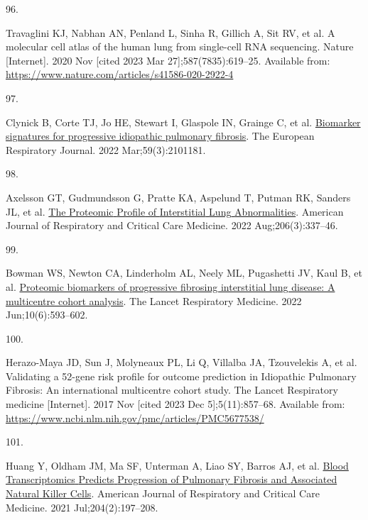 \documentclass[
]{article}
\newlength{\cslhangindent}
\newlength{\csllabelwidth}
\newenvironment{CSLReferences}[2] %
 {\begin{list}{}{%
  \setlength{\itemindent}{0pt}
  \setlength{\leftmargin}{0pt}
  \setlength{\parsep}{0pt}
  \ifodd #1
   \setlength{\leftmargin}{\cslhangindent}
   \setlength{\itemindent}{-1\cslhangindent}
  \fi
  \setlength{\itemsep}{#2\baselineskip}}}
 {\end{list}}
\newcommand{\CSLLeftMargin}[1]{\parbox[t]{\csllabelwidth}{\strut#1\strut}}
\newcommand{\CSLRightInline}[1]{\parbox[t]{\linewidth - \csllabelwidth}{\strut#1\strut}}
\begin{document}
\begin{CSLReferences}{0}{1}
\CSLLeftMargin{96. }%
\CSLRightInline{Travaglini KJ, Nabhan AN, Penland L, Sinha R, Gillich A, Sit RV, et al. A molecular cell atlas of the human lung from single-cell {RNA} sequencing. Nature {[}Internet{]}. 2020 Nov {[}cited 2023 Mar 27{]};587(7835):619--25. Available from: \url{https://www.nature.com/articles/s41586-020-2922-4}}

\CSLLeftMargin{97. }%
\CSLRightInline{Clynick B, Corte TJ, Jo HE, Stewart I, Glaspole IN, Grainge C, et al. \href{https://doi.org/10.1183/13993003.01181-2021}{Biomarker signatures for progressive idiopathic pulmonary fibrosis}. The European Respiratory Journal. 2022 Mar;59(3):2101181. }

\CSLLeftMargin{98. }%
\CSLRightInline{Axelsson GT, Gudmundsson G, Pratte KA, Aspelund T, Putman RK, Sanders JL, et al. \href{https://doi.org/10.1164/rccm.202110-2296OC}{The {Proteomic} {Profile} of {Interstitial} {Lung} {Abnormalities}}. American Journal of Respiratory and Critical Care Medicine. 2022 Aug;206(3):337--46. }

\CSLLeftMargin{99. }%
\CSLRightInline{Bowman WS, Newton CA, Linderholm AL, Neely ML, Pugashetti JV, Kaul B, et al. \href{https://doi.org/10.1016/S2213-2600(21)00503-8}{Proteomic biomarkers of progressive fibrosing interstitial lung disease: A multicentre cohort analysis}. The Lancet Respiratory Medicine. 2022 Jun;10(6):593--602. }

\CSLLeftMargin{100. }%
\CSLRightInline{Herazo-Maya JD, Sun J, Molyneaux PL, Li Q, Villalba JA, Tzouvelekis A, et al. Validating a 52-gene risk profile for outcome prediction in {Idiopathic} {Pulmonary} {Fibrosis}: An international multicentre cohort study. The Lancet Respiratory medicine {[}Internet{]}. 2017 Nov {[}cited 2023 Dec 5{]};5(11):857--68. Available from: \url{https://www.ncbi.nlm.nih.gov/pmc/articles/PMC5677538/}}

\CSLLeftMargin{101. }%
\CSLRightInline{Huang Y, Oldham JM, Ma SF, Unterman A, Liao SY, Barros AJ, et al. \href{https://doi.org/10.1164/rccm.202008-3093OC}{Blood {Transcriptomics} {Predicts} {Progression} of {Pulmonary} {Fibrosis} and {Associated} {Natural} {Killer} {Cells}}. American Journal of Respiratory and Critical Care Medicine. 2021 Jul;204(2):197--208. }


\end{CSLReferences}
\end{document}
